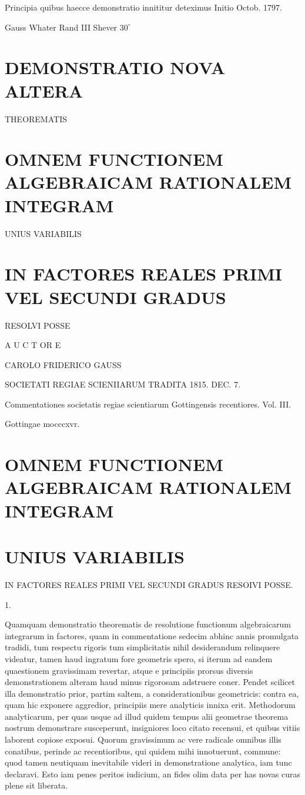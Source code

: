 \documentclass[twoside,12pt, showframe]{memoir}
\begin{document}
Principia quibus haecce demonstratio innititur deteximus Initio Octob. 1797.

\begin{center}
\end{center}

Gauss Whater Rand III Shever \(30^{\circ}\)

\section*{DEMONSTRATIO NOVA ALTERA}
THEOREMATIS

\section*{OMNEM FUNCTIONEM ALGEBRAICAM RATIONALEM INTEGRAM}
UNIUS VARIABILIS

\section*{IN FACTORES REALES PRIMI VEL SECUNDI GRADUS}
RESOLVI POSSE

A U C T OR E

CAROLO FRIDERICO GAUSS

SOCIETATI REGIAE SCIENIIARUM TRADITA 1815. DEC. 7.

Commentationes societatis regiae scientiarum Gottingensis recentiores. Vol. III.

Gottingae mocccxvr.

\section*{OMNEM FUNCTIONEM ALGEBRAICAM RATIONALEM INTEGRAM}
\section*{UNIUS VARIABILIS}
IN FACTORES REALES PRIMI VEL SECUNDI GRADUS RESOIVI POSSE.

1.

Quamquam demonstratio theorematis de resolutione functionum algebraicarum integrarum in factores, quam in commentatione sedecim abhinc annis promulgata tradidi, tum respectu rigoris tum simplicitatis nihil desiderandum relinquere videatur, tamen haud ingratum fore geometris spero, si iterum ad eandem quaestionem gravissimam revertar, atque e principiis prorsus diversis demonstrationem alteram haud minus rigorosam adstruere coner. Pendet scilicet illa demonstratio prior, partim saltem, a considerationibus geometricis: contra ea, quam hic exponere aggredior, principiis mere analyticis innixa erit. Methodorum analyticarum, per quas usque ad illud quidem tempus alii geometrae theorema nostrum demonstrare susceperunt, insigniores loco citato recensui, et quibus vitiis laborent copiose exposui. Quorum gravissimum ac vere radicale omnibus illis conatibus, perinde ac recentioribus, qui quidem mihi innotuerunt, commune: quod tamen neutiquam inevitabile videri in demonstratione analytica, iam tunc declaravi. Esto iam penes peritos iudicium, an fides olim data per has novas curas plene sit liberata.
\end{document}
